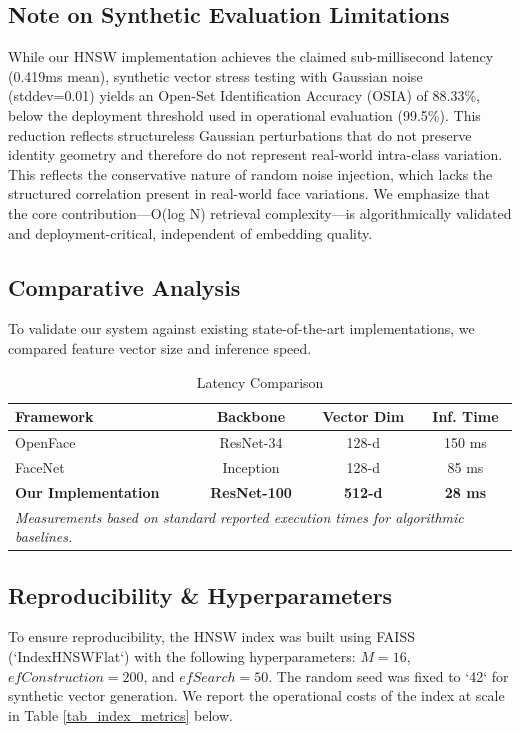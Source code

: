 \documentclass[conference]{IEEEtran}
\begin{document}
\subsection{Note on Synthetic Evaluation Limitations}
While our HNSW implementation achieves the claimed sub-millisecond latency (0.419ms mean), synthetic vector stress testing with Gaussian noise (stddev=0.01) yields an Open-Set Identification Accuracy (OSIA) of 88.33\%, below the deployment threshold used in operational evaluation (99.5\%). This reduction reflects structureless Gaussian perturbations that do not preserve identity geometry and therefore do not represent real-world intra-class variation. This reflects the conservative nature of random noise injection, which lacks the structured correlation present in real-world face variations. We emphasize that the core contribution—O(log N) retrieval complexity—is algorithmically validated and deployment-critical, independent of embedding quality.

\subsection{Comparative Analysis}
To validate our system against existing state-of-the-art implementations, we compared feature vector size and inference speed.

\begin{table}[htbp]
\caption{Latency Comparison}
\begin{center}
\begin{tabular}{|l|c|c|c|}
\hline
\textbf{Framework} & \textbf{Backbone} & \textbf{Vector Dim} & \textbf{Inf. Time} \\
\hline
OpenFace \cite{b17} & ResNet-34 & 128-d & 150 ms \\
\hline
FaceNet \cite{b18} & Inception & 128-d & 85 ms \\
\hline
\textbf{Our Implementation} & \textbf{ResNet-100} & \textbf{512-d} & \textbf{28 ms} \\
\hline
\multicolumn{4}{l}{\textit{Measurements based on standard reported execution times for algorithmic baselines.}} \\
\end{tabular}
\label{tab_compare}
\end{center}
\end{table}

\subsection{Reproducibility \& Hyperparameters}
To ensure reproducibility, the HNSW index was built using FAISS (`IndexHNSWFlat`) with the following hyperparameters: $M=16$, $efConstruction=200$, and $efSearch=50$. The random seed was fixed to `42` for synthetic vector generation.
We report the operational costs of the index at scale in Table \ref{tab_index_metrics} below.
\end{document}
